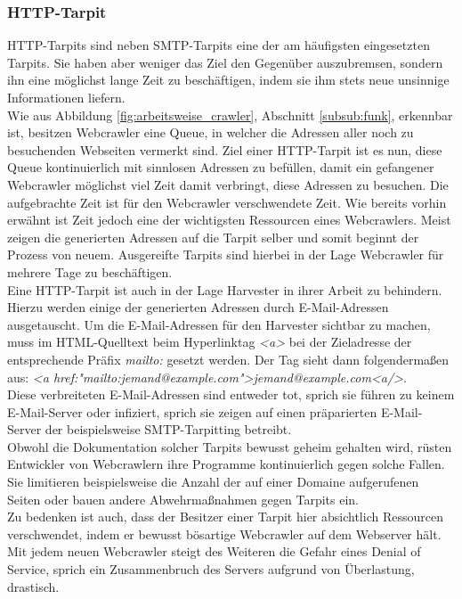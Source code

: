 \subsubsection{HTTP-Tarpit}
HTTP-Tarpits sind neben SMTP-Tarpits eine der am häufigsten eingesetzten Tarpits. Sie haben aber weniger das Ziel den Gegenüber auszubremsen, sondern ihn eine möglichst lange Zeit zu \glqq beschäftigen\grqq , indem sie ihm stets neue unsinnige Informationen liefern.\\
Wie aus Abbildung \ref{fig:arbeitsweise_crawler}, Abschnitt \ref{subsub:funk}, erkennbar ist, besitzen Webcrawler eine Queue, in welcher die Adressen aller noch zu besuchenden Webseiten vermerkt sind. Ziel einer HTTP-Tarpit ist es nun, diese Queue kontinuierlich mit sinnlosen Adressen zu befüllen, damit ein gefangener Webcrawler möglichst viel Zeit damit verbringt, diese Adressen zu besuchen. Die aufgebrachte Zeit ist für den Webcrawler verschwendete Zeit. Wie bereits vorhin erwähnt ist Zeit jedoch eine der wichtigsten Ressourcen eines Webcrawlers. Meist zeigen die generierten Adressen auf die Tarpit selber und somit beginnt der Prozess von neuem. Ausgereifte Tarpits sind hierbei in der Lage Webcrawler für mehrere Tage zu beschäftigen\cite{tarpitting-http-linux-mag}.\\
Eine HTTP-Tarpit ist auch in der Lage Harvester in ihrer Arbeit zu behindern. Hierzu werden einige der generierten Adressen durch E-Mail-Adressen ausgetauscht. Um die E-Mail-Adressen für den Harvester sichtbar zu machen, muss im HTML-Quelltext beim Hyperlinktag \emph{<a>} bei der Zieladresse der entsprechende Präfix \emph{mailto:} gesetzt werden. Der Tag sieht dann folgendermaßen aus: \emph{<a href:"mailto:jemand@example.com">jemand@example.com<a/>}.\\
Diese verbreiteten E-Mail-Adressen sind entweder \glqq tot\grqq, sprich sie führen zu keinem E-Mail-Server oder \glqq infiziert\grqq, sprich sie zeigen auf einen präparierten E-Mail-Server der beispielsweise SMTP-Tarpitting betreibt.\\
Obwohl die Dokumentation solcher Tarpits bewusst geheim gehalten wird, rüsten Entwickler von Webcrawlern ihre Programme kontinuierlich gegen solche Fallen. Sie limitieren beispielsweise die Anzahl der auf einer Domaine aufgerufenen Seiten oder bauen andere Abwehrmaßnahmen gegen Tarpits ein.\\
Zu bedenken ist auch, dass der Besitzer einer Tarpit hier absichtlich Ressourcen verschwendet, indem er bewusst bösartige Webcrawler auf dem Webserver hält. Mit jedem neuen Webcrawler steigt des Weiteren die Gefahr eines Denial of Service, sprich ein Zusammenbruch des Servers aufgrund von Überlastung, drastisch\cite{tarpitting-http-eggendorf-auugn}.\\
